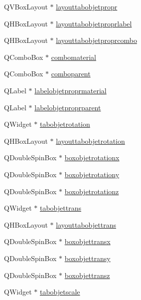 \begin{DoxyCompactItemize}
\item 
Q\+V\+Box\+Layout $\ast$ \hyperlink{class_mondock_ac56ddde4fb8bc59837027ed14f8b19d8}{layouttabobjetpropr}
\item 
Q\+H\+Box\+Layout $\ast$ \hyperlink{class_mondock_a933e33341a7ad640413b19c6d811559a}{layouttabobjetproprlabel}
\item 
Q\+H\+Box\+Layout $\ast$ \hyperlink{class_mondock_a666eed2f58369dbaea12c10c9c5f4888}{layouttabobjetproprcombo}
\item 
Q\+Combo\+Box $\ast$ \hyperlink{class_mondock_ab8773b4c45e6e0e13a9bb22793e3c870}{combomaterial}
\item 
Q\+Combo\+Box $\ast$ \hyperlink{class_mondock_a32ebd1f643a5f1b9749eb4f9d4940973}{comboparent}
\item 
Q\+Label $\ast$ \hyperlink{class_mondock_ac49c211334c5b4502c99dc47ff86fe1c}{labelobjetproprmaterial}
\item 
Q\+Label $\ast$ \hyperlink{class_mondock_a4d76ec3b85d44b07f7147f5b2a7c68a7}{labelobjetproprparent}
\item 
Q\+Widget $\ast$ \hyperlink{class_mondock_a917509c60bf1cd3eff74b0bd9c606dae}{tabobjetrotation}
\item 
Q\+H\+Box\+Layout $\ast$ \hyperlink{class_mondock_ab36da4ccb733ba45b30be8c325a593d9}{layouttabobjetrotation}
\item 
Q\+Double\+Spin\+Box $\ast$ \hyperlink{class_mondock_accc1854d02d6d2a0b61297b351bd196a}{boxobjetrotationx}
\item 
Q\+Double\+Spin\+Box $\ast$ \hyperlink{class_mondock_aeeea985e7f23ebf81696648d8e0dea40}{boxobjetrotationy}
\item 
Q\+Double\+Spin\+Box $\ast$ \hyperlink{class_mondock_af722379e41c8ebc43f6068754564aa4f}{boxobjetrotationz}
\item 
Q\+Widget $\ast$ \hyperlink{class_mondock_a8eee5e642f5cb6d30635c80417576622}{tabobjettrans}
\item 
Q\+H\+Box\+Layout $\ast$ \hyperlink{class_mondock_a1776a6148557d83c98a8a05368c08eef}{layouttabobjettrans}
\item 
Q\+Double\+Spin\+Box $\ast$ \hyperlink{class_mondock_a906d6de66e15f9b964d68947ac8ee94e}{boxobjettransx}
\item 
Q\+Double\+Spin\+Box $\ast$ \hyperlink{class_mondock_a15ed0b5c13500bfad6a2b5289c5a3ddf}{boxobjettransy}
\item 
Q\+Double\+Spin\+Box $\ast$ \hyperlink{class_mondock_ab0102fb06cf68a8c70fed13550b4dcb6}{boxobjettransz}
\item 
Q\+Widget $\ast$ \hyperlink{class_mondock_a2463c02b8f4ff3f1ff23f2f72e3c0f48}{tabobjetscale}

\end{DoxyCompactItemize}

